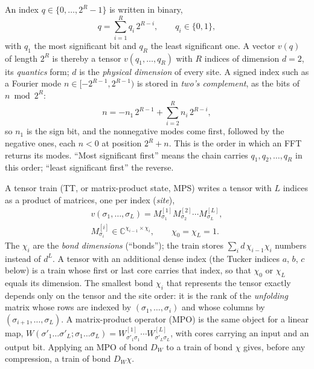 \documentclass[aps,prb,reprint,a4paper]{revtex4-2}
\begin{document}
An index $q\in\{0,\ldots,2^R-1\}$ is written in binary,
\begin{equation}
  q=\sum_{i=1}^Rq_i\,2^{R-i},\qquad q_i\in\{0,1\},
  \label{eq:bits}
\end{equation}
with $q_1$ the most significant bit and $q_R$ the least significant one. A vector $v(q)$ of length $2^R$ is thereby a tensor $v(q_1,\ldots,q_R)$ with $R$ indices of dimension $d=2$, its \emph{quantics} form; $d$ is the \emph{physical dimension} of every site. A signed index such as a Fourier mode $n\in[-2^{R-1},2^{R-1})$ is stored in \emph{two's complement}, as the bits of $n\bmod2^R$:
\begin{equation}
  n=-n_1\,2^{R-1}+\sum_{i=2}^Rn_i\,2^{R-i},
  \label{eq:twos}
\end{equation}
so $n_1$ is the sign bit, and the nonnegative modes come first, followed by the negative ones, each $n<0$ at position $2^R+n$. This is the order in which an FFT returns its modes. ``Most significant first'' means the chain carries $q_1,q_2,\ldots,q_R$ in this order; ``least significant first'' the reverse.

A tensor train (TT, or matrix-product state, MPS) writes a tensor with $L$ indices as a product of matrices, one per index (\emph{site}),
\begin{equation}
  \begin{gathered}
  v(\sigma_1,\ldots,\sigma_L)=M^{[1]}_{\sigma_1}M^{[2]}_{\sigma_2}\cdots M^{[L]}_{\sigma_L},\\
  M^{[i]}_{\sigma_i}\in\mathbb C^{\chi_{i-1}\times\chi_i},\qquad\chi_0=\chi_L=1 .
  \end{gathered}
  \label{eq:tt}
\end{equation}
The $\chi_i$ are the \emph{bond dimensions} (``bonds''); the train stores $\sum_id\,\chi_{i-1}\chi_i$ numbers instead of $d^L$. A tensor with an additional dense index (the Tucker indices $a$, $b$, $c$ below) is a train whose first or last core carries that index, so that $\chi_0$ or $\chi_L$ equals its dimension. The smallest bond $\chi_i$ that represents the tensor exactly depends only on the tensor and the site order: it is the rank of the \emph{unfolding} matrix whose rows are indexed by $(\sigma_1,\ldots,\sigma_i)$ and whose columns by $(\sigma_{i+1},\ldots,\sigma_L)$. A matrix-product operator (MPO) is the same object for a linear map, $W(\sigma'_1\ldots\sigma'_L;\sigma_1\ldots\sigma_L)=W^{[1]}_{\sigma'_1\sigma_1}\cdots W^{[L]}_{\sigma'_L\sigma_L}$, with cores carrying an input and an output bit. Applying an MPO of bond $D_W$ to a train of bond $\chi$ gives, before any compression, a train of bond $D_W\chi$.
\end{document}
